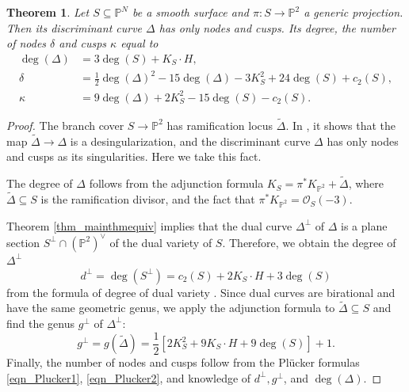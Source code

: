 \documentclass[12pt]{amsart}
\newtheorem{theorem}{Theorem}[section]
\begin{document}
\begin{theorem}\cite{CMT01, CilFla11}
    Let $S\subseteq \mathbb P^N$ be a smooth surface and $\pi:S\to \mathbb P^2$ a generic projection. Then its discriminant curve $\Delta$ has only nodes and cusps. Its degree, the number of nodes $ \delta$ and cusps $\kappa$ equal to 
\begin{align}
\deg(\Delta)&=3\deg(S)+K_S\cdot H,\\
   \delta&=\frac12\deg(\Delta)^2-15\deg(\Delta)-3K_S^2+24\deg (S)+c_2(S),\\
    \kappa&=9\deg(\Delta)+2K_S^2-15\deg(S)-c_2(S).  
\end{align}
\end{theorem}
\begin{proof}The branch cover $S\to \mathbb P^2$ has ramification locus $\tilde{\Delta}$. In \cite{CilFla11}, it shows that the map $\tilde{\Delta}\to \Delta$ is a desingularization, and the discriminant curve $\Delta$ has only nodes and cusps as its singularities. Here we take this fact.

The degree of $\Delta$ follows from the adjunction formula $K_S=\pi^*K_{\mathbb P^2}+\tilde{\Delta}$, where $\tilde{\Delta}\subseteq S$ is the ramification divisor, and the fact that $\pi^*K_{\mathbb P^2}=\mathcal{O}_S(-3)$.
 

   Theorem \ref{thm_mainthmequiv} implies that the dual curve $\Delta^{\perp}$ of $\Delta$ is a plane section $S^{\perp}\cap (\mathbb P^2)^{\vee}$ of the dual variety of $S$. Therefore, we obtain the degree of $\Delta^{\perp}$
$$d^{\perp}=\deg(S^{\perp})=c_2(S)+2K_S\cdot H+3\deg(S)$$
from the formula of degree of dual variety \cite[IV,64]{Kle77}. Since dual curves are birational and have the same geometric genus, we apply the adjunction formula to $\tilde{\Delta}\subseteq S$ and find the genus $g^{\perp}$ of $\Delta^{\perp}$:
$$g^{\perp}=g(\tilde{\Delta})=\frac12[2K_S^2+9K_S\cdot H+9\deg(S)]+1.$$ 
Finally, the number of nodes and cusps follow from the Pl\"ucker formulas \eqref{eqn_Plucker1}, \eqref{eqn_Plucker2}, and knowledge of $d^{\perp},g^{\perp}$, and $\deg(\Delta)$.
\end{proof}
\end{document}
